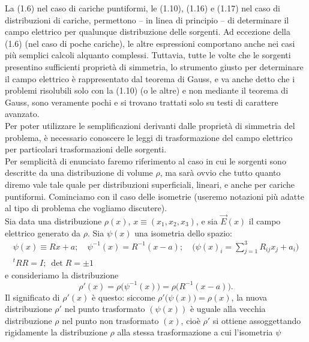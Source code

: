 La (1.6) nel caso di cariche puntiformi, le (1.10), (1.16) e (1.17) nel caso di
distribuzioni di cariche, permettono -- in linea di principio -- di determinare
il campo elettrico per qualunque distribuzione delle sorgenti. Ad eccezione
della (1.6) (nel caso di poche cariche), le altre espressioni comportano anche
nei casi pi\`u semplici calcoli alquanto complessi. Tuttavia, tutte le volte che
le sorgenti presentino sufficienti propriet\`a di simmetria, lo strumento giusto
per determinare il campo elettrico \`e rappresentato dal teorema di Gauss, e va
anche detto che i problemi risolubili solo con la (1.10) (o le altre) e non
mediante il teorema di Gauss, sono veramente pochi e si trovano trattati solo su
testi di carattere avanzato.\\
Per poter utilizzare le semplificazioni derivanti dalle propriet\`a di simmetria
del problema, \`e necessario conoscere le leggi di trasformazione del campo
elettrico per particolari trasformazioni delle sorgenti.\\
Per semplicit\`a di enunciato faremo riferimento al caso in cui le sorgenti sono
descritte da una distribuzione di volume $\rho$, ma sar\`a ovvio che tutto
quanto diremo vale tale quale per distribuzioni superficiali, lineari, e anche
per cariche puntiformi. Cominciamo con il caso delle isometrie (useremo
notazioni pi\`u adatte al tipo di problema che vogliamo discutere).\\
Sia data una distribuzione $\rho(x)$, $x\equiv(x_1,x_2,x_3)$, e sia $\vec E(x)$
il campo elettrico generato da $\rho$. Sia $\psi(x)$ una isometria dello spazio:
\begin{equation}
  \begin{gathered}
    \psi(x)\equiv Rx+a;\quad\psi^{-1}(x)=R^{-1}(x-a);
    \quad\Big(\psi(x)_i=\sum_{j=1}^3R_{ij}x_j+a_i\Big)\\
    {}^t\!RR=I;\ \det R=\pm1
  \end{gathered}
  \tag{1.37}
\end{equation}
e consideriamo la distribuzione
\begin{equation}
  \rho'(x)=\rho\big(\psi^{-1}(x)\big)=\rho\big(R^{-1}(x-a)\big).
  \tag{1.38}
\end{equation}
Il significato di $\rho'(x)$ \`e questo: siccome
$\rho'\big(\psi(x)\big)=\rho(x)$, la nuova distribuzione $\rho'$ nel punto
trasformato $(\psi(x))$ \`e uguale alla vecchia distribuzione $\rho$ nel punto
non trasformato $(x)$, cio\`e $\rho'$ si ottiene assoggettando rigidamente la
distribuzione $\rho$ alla stessa trasformazione a cui l'isometria $\psi$
